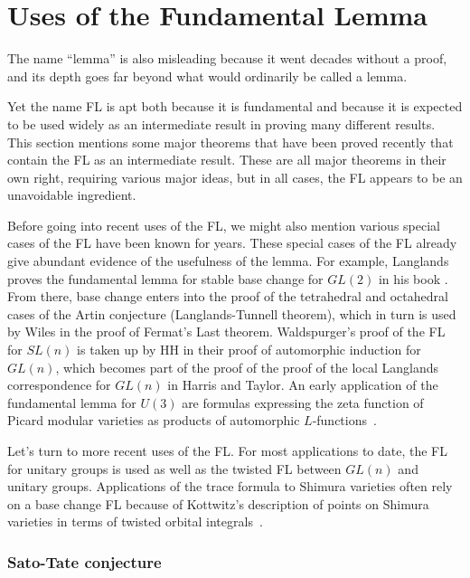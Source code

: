 \documentclass[brochure,english,12pt]{bourbaki}
\begin{document}
\section{Uses of the Fundamental Lemma}  

The name ``lemma'' is also misleading because it went decades
without a proof, and its depth goes far beyond what would ordinarily be
called a lemma.  

Yet the name FL is apt both because it is fundamental and
because it is expected to be used widely as an intermediate result in
proving many different results.  This section mentions some major
theorems that have been proved recently that contain the FL as an
intermediate result.  These are all major theorems in their own right,
requiring various major ideas, but in all cases, the FL appears to be
an unavoidable ingredient.

Before going into recent uses of the FL, we might also mention various
special cases of the FL have been known for years.  These special
cases of the FL already give abundant evidence of the usefulness of
the lemma.  For example, Langlands proves the fundamental lemma for
stable base change for $GL(2)$ in his book \cite[Lemma~5.10]{BC}.
From there, base change enters into the proof of the tetrahedral and
octahedral cases of the Artin conjecture (Langlands-Tunnell theorem),
which in turn is used by Wiles in the proof of Fermat's Last theorem.
Waldspurger's proof of the FL for $SL(n)$ is taken up by HH in their
proof of automorphic induction for $GL(n)$, which becomes part of the
proof of the proof of the local Langlands correspondence for $GL(n)$
in Harris and Taylor.  An early application of the fundamental lemma
for $U(3)$ are formulas expressing the zeta function of Picard modular
varieties as products of automorphic $L$-functions~\cite{Pic}.

Let's turn to more recent uses of the FL.   For most applications to date,
the FL for unitary groups is used as well as the twisted FL between $GL(n)$
and unitary groups.  Applications of the trace formula to Shimura varieties often rely on
a  base change FL because of Kottwitz's description of points on Shimura
varieties in terms of twisted orbital integrals~\cite{Kottwitz}.



\subsubsection{Sato-Tate conjecture}
\end{document}
